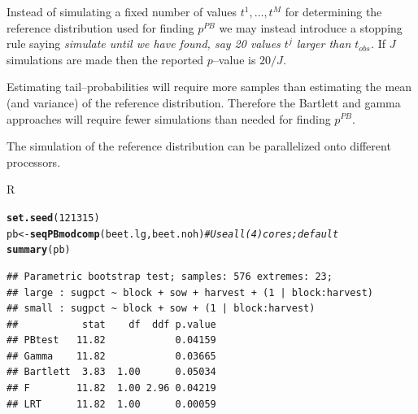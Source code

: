 \documentclass[compress]{beamer}\usepackage[]{graphicx}\usepackage[]{color}
\makeatletter
\newcommand{\hlnum}[1]{\textcolor[rgb]{0.686,0.059,0.569}{#1}}%
\newcommand{\hlcom}[1]{\textcolor[rgb]{0.678,0.584,0.686}{\textit{#1}}}%
\newcommand{\hlstd}[1]{\textcolor[rgb]{0.345,0.345,0.345}{#1}}%
\newcommand{\hlkwb}[1]{\textcolor[rgb]{0.69,0.353,0.396}{#1}}%
\newcommand{\hlkwd}[1]{\textcolor[rgb]{0.737,0.353,0.396}{\textbf{#1}}}%
\newenvironment{kframe}{%
 \def\at@end@of@kframe{}%
 \ifinner\ifhmode%
  \def\at@end@of@kframe{\end{minipage}}%
  \begin{minipage}{\columnwidth}%
 \fi\fi%
 \def\FrameCommand##1{\hskip\@totalleftmargin \hskip-\fboxsep
 \colorbox{shadecolor}{##1}\hskip-\fboxsep
     \hskip-\linewidth \hskip-\@totalleftmargin \hskip\columnwidth}%
 \MakeFramed {\advance\hsize-\width
   \@totalleftmargin\z@ \linewidth\hsize
   \@setminipage}}%
 {\par\unskip\endMakeFramed%
 \at@end@of@kframe}
\newenvironment{knitrout}{}{} %
\newenvironment{sframe}
{\begin{frame} [containsverbatim] }
  {\end{frame}}
\newenvironment{sblock}
{\begin{block}{R}}
  {\end{block}}
\makeatother
\begin{document}
\begin{sframe}

  Instead of simulating a fixed number of values $t^1, \dots, t^M$ for
  determining the reference distribution used for finding $p^{PB}$
  we may instead introduce a stopping rule saying \emph{simulate until we
  have found, say 20 values $t^j$ larger than $t_{obs}$.} If $J$
  simulations are made then the reported $p$--value is $20/J$.

  Estimating tail--probabilities will require more samples than
  estimating the mean (and variance) of the reference
  distribution. Therefore the Bartlett and gamma approaches will
  require fewer simulations than needed for finding $p^{PB}$.

  The simulation of the reference distribution can be parallelized
  onto different processors.

  
 
  
\end{sframe}

\begin{sframe}
\begin{sblock}
\begin{knitrout}\scriptsize
{}\color{fgcolor}\begin{kframe}
\begin{alltt}
\hlkwd{set.seed}\hlstd{(}\hlnum{121315}\hlstd{)}
\hlstd{pb} \hlkwb{<-} \hlkwd{seqPBmodcomp}\hlstd{(beet.lg, beet.noh)} \hlcom{# Use all (4) cores; default}
\hlkwd{summary}\hlstd{(pb)}
\end{alltt}
\begin{verbatim}
## Parametric bootstrap test; samples: 576 extremes: 23;
## large : sugpct ~ block + sow + harvest + (1 | block:harvest)
## small : sugpct ~ block + sow + (1 | block:harvest)
##           stat    df  ddf p.value
## PBtest   11.82            0.04159
## Gamma    11.82            0.03665
## Bartlett  3.83  1.00      0.05034
## F        11.82  1.00 2.96 0.04219
## LRT      11.82  1.00      0.00059
\end{verbatim}
\end{kframe}
\end{knitrout}
\end{sblock}  
  
\end{sframe}


\end{document}
